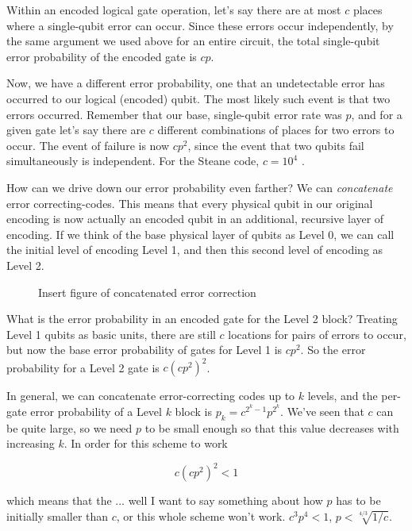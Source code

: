 Within an encoded logical gate operation, let's say there are at most $c$
places where a single-qubit error can occur. Since these errors occur
independently, by the same argument we used above for an entire circuit,
the total single-qubit error probability of the encoded gate is $cp$.

Now, we have a different error probability, one that an undetectable error
has occurred to our logical (encoded) qubit. The most likely such event is that
two errors occurred. Remember that our base, single-qubit error rate was
$p$, and for a given gate let's say there are $c$ different combinations of
places for two errors to occur. The event of failure is now $cp^2$, since the
event that two qubits fail simultaneously is independent. For the Steane
code, $c=10^4$ \cite{Nielsen2000}.

How can we drive down our error probability even farther?
We can \emph{concatenate} error correcting-codes. This means
that every physical qubit in our original encoding is now actually an
encoded qubit in an additional, recursive layer of encoding. If we think of
the base physical layer of qubits as Level 0, we can call the
initial level of encoding Level 1, and then this second level of encoding
as Level 2.

\begin{figure}
\caption{Insert figure of concatenated error correction}
\end{figure}

What is the error probability in an encoded gate for the Level 2 block?
Treating Level 1 qubits as basic units, there are still $c$ locations for
pairs of errors to occur, but now the base error probability of gates for
Level 1 is $cp^2$. So the error probability for a Level 2 gate is
$c(cp^2)^2$.

In general, we can concatenate error-correcting codes up to $k$ levels, and
the per-gate error probability of a Level $k$ block is $p_k = c^{2^k-1}p^{2^k}$.
We've seen that $c$ can be quite large, so we need $p$ to be small enough
so that this value decreases with increasing $k$. In order for this scheme
to work

\begin{displaymath}
c(cp^2)^2 < 1
\end{displaymath}

which means that the ... well I want to say something about how $p$ has
to be initially smaller than $c$, or this whole scheme won't work.
$c^3 p^4 < 1$, $p < \sqrt[4/3]{1/c}$.

